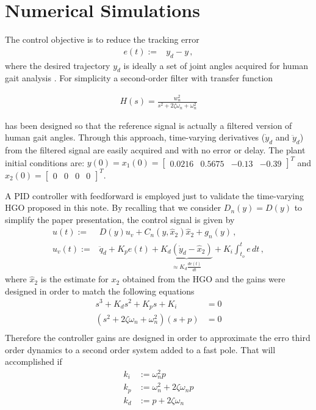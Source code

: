 \documentclass[letterpaper, 10 pt, journal, twocolumn]{IEEEtran}  %
\theoremstyle{plain}
\theoremstyle{definition}
\theoremstyle{remark}
\begin{document}
\section{Numerical Simulations}
\label{sec:Numerical_Simulation}

The control objective is to reduce the tracking error 
%
\begin{align}
e(t) := & y_{d} - y\,,
\end{align}
%
where the desired trajectory $y_d$ is ideally a set of joint angles acquired for human gait analysis \cite{Schwartz2008}. For simplicity a second-order filter with transfer function

\begin{align}
	H(s) = \frac{w_{n}^2}{s^2 + 2\zeta \omega_n + \omega_n^2}
\end{align}

has been designed so that the reference signal is actually a filtered version of human gait angles. Through this approach, time-varying derivatives ($\dot{y}_d$ and $\ddot{y}_d$) from the filtered signal are easily acquired and with no error or delay. The plant initial conditions are: $y(0)=x_1(0)=\left[\begin{array}{cccc} 0.0216  & 0.5675 & -0.13 & -0.39\end{array} \right ]^T$ and $x_2(0)=\left[\begin{array}{cccc} 0  & 0 & 0 & 0\end{array} \right ]^T$.


A  PID controller with feedforward is employed just to validate the time-varying HGO proposed in this note. By recalling that we  consider $D_n(y)=D(y)$ to simplify the paper presentation, the control  signal is given by
%
\begin{align}
u(t) := & D(y) u_v + C_{n}(y,\hat{x}_2) \hat{x}_2+g_{n}(y)\,, \\
u_v(t):= &\ddot{q}_d + K_p e(t) + \underbrace{K_d (\dot{y}_d - \hat{x}_2)}_{\approx K_d \frac{de(t)}{dt}} + K_i\int_{t_o}^{t}e \, dt\,,
\label{eq:defu}
\end{align}
%
where $\hat{x}_2$ is the estimate for $x_2$ obtained from the HGO and the gains were designed in order to match the following equations
%
\begin{align}
	s^3 + K_ds^2 + K_ps + K_i &= 0 \\
	(s^2 + 2\zeta \omega_n + \omega_n^2)(s + p) &= 0 \\
\end{align}
%
Therefore the controller gains are designed in order to approximate the erro third order dynamics to a second order system added to a fast pole. That will accomplished if
\begin{align}
	k_i &:= \omega_n^2p \\
	k_p &:= \omega_n^2 + 2\zeta \omega_np \\
	k_d &:= p + 2\zeta \omega_n 
\end{align}
\end{document}
